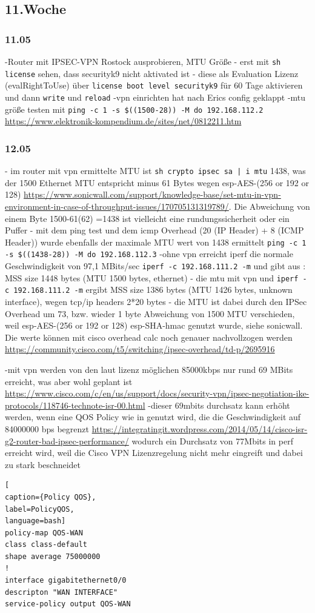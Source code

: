 \documentclass[english,runningheads,a4paper]{llncs}[2018/03/10]
\begin{document}
\subsection{11.Woche}
\subsubsection{11.05}
-Router mit IPSEC-VPN Rostock ausprobieren, MTU Größe
- erst mit \texttt{sh license} sehen, dass securityk9 nicht aktivated ist
- diese als Evaluation Lizenz (evalRightToUse)  über \texttt{license boot level securityk9} für 60 Tage aktivieren und dann \texttt{write} und \texttt{reload}
-vpn einrichten hat nach Erics config geklappt
-mtu größe testen mit \texttt{ping -c 1 -s \$((1500-28)) -M do 192.168.112.2} \url{https://www.elektronik-kompendium.de/sites/net/0812211.htm}
\subsubsection{12.05}
- im router mit vpn ermittelte MTU ist \texttt{sh crypto ipsec sa | i mtu} 1438, was der 1500 Ethernet MTU entspricht minus 61 Bytes wegen esp-AES-(256 or 192 or 128) \url{https://www.sonicwall.com/support/knowledge-base/set-mtu-in-vpn-environment-in-case-of-throughput-issues/170705131319789/}. Die Abweichung von einem Byte 1500-61(62) =1438 ist vielleicht eine rundungssicherheit oder ein Puffer
- mit dem ping test und dem icmp Overhead (20 (IP Header) + 8 (ICMP Header)) wurde ebenfalls der maximale MTU wert von 1438 ermittelt \texttt{ping -c 1 -s \$((1438-28)) -M do 192.168.112.3}
-ohne vpn erreicht iperf die normale Geschwindigkeit von 97,1 MBits/sec \texttt{iperf -c 192.168.111.2 -m} und gibt aus :  MSS size 1448 bytes (MTU 1500 bytes, ethernet)
- die mtu mit vpn und \texttt{iperf -c 192.168.111.2 -m} ergibt  MSS size 1386 bytes (MTU 1426 bytes, unknown interface), wegen tcp/ip headers 2*20 bytes
- die MTU ist dabei durch den IPSec Overhead um 73, bzw. wieder 1 byte Abweichung von 1500 MTU verschieden, weil esp-AES-(256 or 192 or 128) esp-SHA-hmac genutzt wurde, siehe sonicwall. Die werte können mit cisco overhead calc noch genauer nachvollzogen werden \url{https://community.cisco.com/t5/switching/ipsec-overhead/td-p/2695916}

-mit vpn werden von den laut lizenz möglichen 85000kbps nur rund 69 MBits erreicht, was aber wohl geplant ist \url{https://www.cisco.com/c/en/us/support/docs/security-vpn/ipsec-negotiation-ike-protocols/118746-technote-isr-00.html}
-dieser 69mbits durchsatz kann erhöht werden, wenn eine QOS Policy wie in  genutzt wird, die die Geschwindigkeit auf 84000000 bps begrenzt \url{https://integratingit.wordpress.com/2014/05/14/cisco-isr-g2-router-bad-ipsec-performance/} wodurch ein Durchsatz von 77Mbits in perf erreicht wird, weil die Cisco VPN Lizenzregelung nicht mehr eingreift und dabei zu stark beschneidet
\begin{lstlisting}[
caption={Policy QOS},
label=PolicyQOS,
language=bash]
policy-map QOS-WAN
class class-default
shape average 75000000
!
interface gigabitethernet0/0
descripton "WAN INTERFACE"
service-policy output QOS-WAN
\end{lstlisting}
\end{document}

